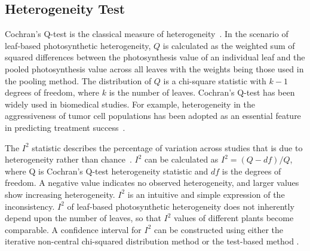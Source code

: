 \documentclass{bioinfo}
\begin{document}
\vspace{-0.2in}
\subsection{Heterogeneity Test}

Cochran's Q-test is the classical measure of heterogeneity~\citep{conover1999Practical}. In the scenario of leaf-based photosynthetic heterogeneity, $Q$ is calculated as the weighted sum of squared differences between the photosynthesis value of an individual leaf and the pooled photosynthesis value across all leaves with the weights being those used in the pooling method. The distribution of $Q$ is a chi-square statistic with $k-1$ degrees of freedom, where $k$ is the number of leaves. Cochran's Q-test has been widely used in biomedical studies. For example, heterogeneity in the aggressiveness of tumor cell populations has been adopted as an essential feature in predicting treatment success~\citep{OSullivan2003}. %
%
%

The $I^2$ statistic describes the percentage of variation across studies that is due to heterogeneity rather than chance~\citep{higgins2002quantifying,higgins2003measuring}. $I^2$ can be calculated as $I^2 = (Q - df)/Q$, where Q is Cochran's Q-test heterogeneity statistic and $df$ is the degrees of freedom. A negative value  indicates no observed heterogeneity, and larger values show increasing heterogeneity. $I^2$ is an intuitive and simple expression of the inconsistency. $I^2$ of leaf-based photosynthetic heterogeneity does not inherently depend upon the number of leaves, so that $I^2$ values of different plants become comparable. A confidence interval for $I^2$ can be constructed using either the iterative non-central chi-squared distribution method \citep{hedges2001power} or the test-based method \citep{higgins2002quantifying}.
\end{document}
